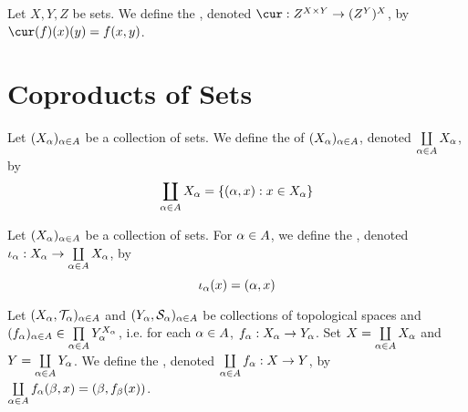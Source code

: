 \documentclass{book}
\begin{document}
	\begin{defn} 
		Let $X, Y, Z$ be sets. We define the , denoted $\cur: Z^{X \times Y} \rightarrow (Z^Y)^X$, by 
		$\cur(f)(x)(y) = f(x, y)$. 
	\end{defn}
	
	
	
	
	
	
	
	
	
	
	
	
	
	
	
	
	
	
	
	
	
	
	
	
	
	
	
	
	
	
	
	
	
	
	
	
	
	
	
	
	
	
	
	
	
	
	
	\newpage
	\section{Coproducts of Sets}
	
	\begin{defn} 
		Let $(X_{\alpha})_{\alpha \in A}$ be a collection of sets. We define the  of $(X_{\alpha})_{\alpha \in A}$, denoted $\coprod\limits_{\alpha \in A}X_{\alpha}$, by 
		$$\coprod_{\alpha \in A}X_{\alpha} = \{(\alpha, x): x \in X_{\alpha} \}$$
	\end{defn}
	
	\begin{defn} 
		Let $(X_{\alpha})_{\alpha \in A}$ be a collection of sets. For $\alpha \in A$, we define the , denoted $\iota_{\alpha}: X_{\alpha} \rightarrow \coprod\limits_{\alpha \in A}X_{\alpha}$, by 
		$$\iota_{\alpha}(x) = (\alpha, x)$$
	\end{defn}

	\begin{defn} 
		Let $(X_{\alpha}, \mathcal{T}_{\alpha})_{\alpha \in A}$ and $(Y_{\alpha}, \mathcal{S}_{\alpha})_{\alpha \in A}$ be collections of topological spaces and $(f_{\alpha})_{\alpha \in A} \in \prod\limits_{\alpha \in A} Y_{\alpha}^{X_{\alpha}}$, i.e. for each $\alpha \in A$, $f_{\alpha}:X_{\alpha} \rightarrow Y_{\alpha}$. Set $X = \coprod\limits_{\alpha \in A} X_{\alpha}$ and $Y = \coprod\limits_{\alpha \in A}Y_{\alpha}$. We define the , denoted $\coprod\limits_{\alpha \in A} f_{\alpha}: X \rightarrow Y$, by $\coprod\limits_{\alpha \in A} f_{\alpha} (\beta, x) = (\beta, f_{\beta}(x))$.
	\end{defn}
\end{document}
